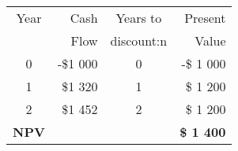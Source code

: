 \begin{tabular}{|c|r|c|r|}
\hline
Year  & Cash & Years to & Present \\
 & Flow & discount:n & Value \\
\hline
0 & -\$1 000 & 0 & -\$ 1 000 \\
1 &  \$1 320 & 1 & \$ 1 200 \\
2 &  \$1 452 & 2 & \$ 1 200 \\
\textbf{NPV} &  &  & \textbf{\$ 1 400} \\
\hline
\end{tabular}